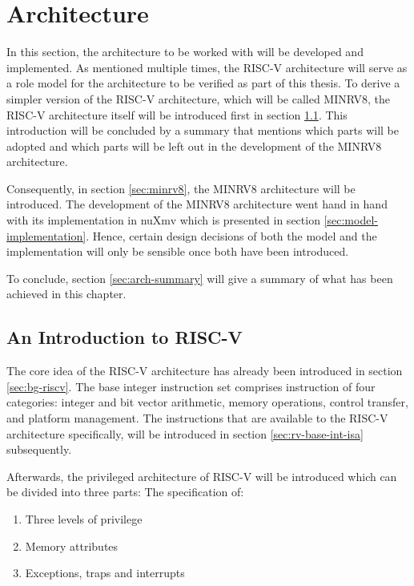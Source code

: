 
\chapter{Architecture}
\label{chp:arch}

In this section, the architecture to be worked with will be developed and implemented.
As mentioned multiple times, the RISC-V architecture will serve as a role model for the architecture to be verified as part of this thesis.
To derive a simpler version of the RISC-V architecture, which will be called MINRV8, the RISC-V architecture itself will be introduced first in section \ref{sec:risc-v}.
This introduction will be concluded by a summary that mentions which parts will be adopted and which parts will be left out in the development of the MINRV8 architecture.

Consequently, in section \ref{sec:minrv8}, the MINRV8 architecture will be introduced.
The development of the MINRV8 architecture went hand in hand with its implementation in nuXmv which is presented in section \ref{sec:model-implementation}.
Hence, certain design decisions of both the model and the implementation will only be sensible once both have been introduced.

To conclude, section \ref{sec:arch-summary} will give a summary of what has been achieved in this chapter.

\section{An Introduction to RISC-V}
\label{sec:risc-v}

The core idea of the RISC-V architecture has already been introduced in section \ref{sec:bg-riscv}.
The base integer instruction set comprises instruction of four categories: integer and bit vector arithmetic, memory operations, control transfer, and platform management.
The instructions that are available to the RISC-V architecture specifically, will be introduced in section \ref{sec:rv-base-int-isa} subsequently.

Afterwards, the privileged architecture of RISC-V will be introduced which can be divided into three parts:
The specification of:
\begin{enumerate}
    \item Three levels of privilege
    \item Memory attributes
    \item Exceptions, traps and interrupts
\end{enumerate}

